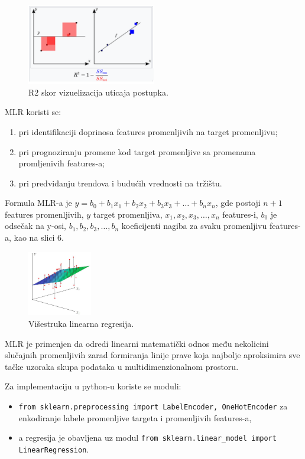 \documentclass[fontsize=12bp, paper=a4]{scrarticle}
\begin{document}
\begin{enumerate}
    \begin{figure}[h!]
        \centering
        \includegraphics[width=0.5\textwidth]{5.png}
        \caption{\centering R2 skor vizuelizacija uticaja postupka.}
    \end{figure}
\end{enumerate}


MLR koristi se:
\begin{enumerate}
    \item pri identifikaciji doprinosa features promenljivih na target promenljivu;
    \item pri prognoziranju promene kod target promenljive sa promenama promljenivih features-a;
    \item pri predviđanju trendova i budućih vrednosti na tržištu.
\end{enumerate}



Formula MLR-a je $y =  b_0 + b_1x_1 + b_2x_2 + b_3x_3 + \dots + b_nx_n$, gde postoji $n+1$ features promenljivih, $y$ target promenljiva, $x_1, x_2, x_3, \dots ,x_n$ features-i, $b_0$ je odsečak na y-osi, $b_1, b_2, b_3, \dots, b_n$ koeficijenti nagiba za svaku promenljivu features-a, kao na slici 6.
\begin{figure}[h!]
    \centering
    \includegraphics[width=0.25\textwidth]{6.png}
    \caption{\centering Višestruka linearna regresija.}
\end{figure}
MLR je primenjen da odredi linearni matematički odnos među nekolicini slučajnih promenljivih zarad formiranja linije prave koja najbolje aproksimira sve tačke uzoraka skupa podataka u multidimenzionalnom prostoru. 

Za implementaciju u python-u koriste se moduli:
\begin{itemize}
    \item \verb|from sklearn.preprocessing import LabelEncoder, OneHotEncoder| za enkodiranje labele promenljive targeta i promenljivih features-a,
    \item a regresija je obavljena uz modul \verb|from sklearn.linear_model import LinearRegression|.
\end{itemize}
\end{document}
